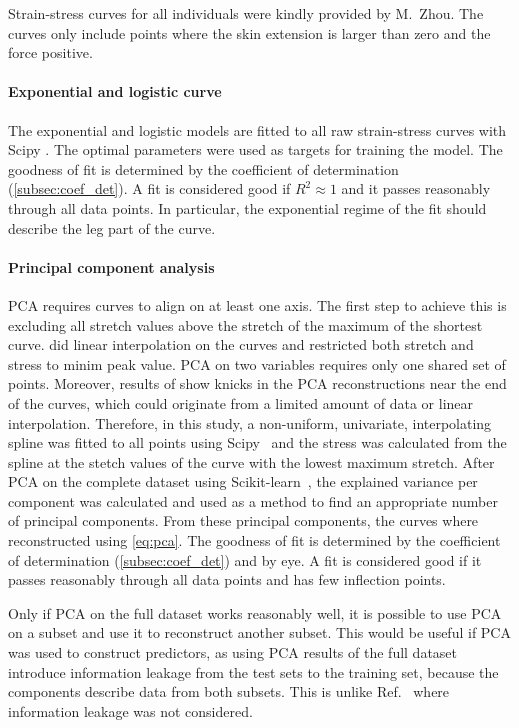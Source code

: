 Strain-stress curves for all individuals were kindly provided by M.\ Zhou.
The curves only include points where the skin extension is larger than zero and the force positive.

\paragraph{Exponential and logistic curve}
The exponential and logistic models are fitted to all raw strain-stress curves with Scipy .
The optimal parameters were used as targets for training the model.
The goodness of fit is determined by the coefficient of determination (\cref{subsec:coef_det}).
A fit is considered good if $R^2 \approx 1$ and it passes reasonably through all data points.
In particular, the exponential regime of the fit should describe the leg part of the curve.

\paragraph{Principal component analysis}
PCA requires curves to align on at least one axis.
The first step to achieve this is excluding all stretch values above the stretch of the maximum of the shortest curve.
\citeauthor{Soylu2022}  did linear interpolation on the curves and restricted both stretch and stress to minim peak value.
PCA on two variables requires only one shared set of points.
Moreover, results of \citeauthor{Soylu2022} show knicks in the PCA reconstructions near the end of the curves, which could originate from a limited amount of data or linear interpolation.
Therefore, in this study, a non-uniform, univariate, interpolating spline was fitted to all points using Scipy~ and the stress was calculated from the spline at the stetch values of the curve with the lowest maximum stretch.
After PCA on the complete dataset using Scikit-learn~, the explained variance per component was calculated and used as a method to find an appropriate number of principal components.
From these principal components, the curves where reconstructed using \cref{eq:pca}.
The goodness of fit is determined by the coefficient of determination (\cref{subsec:coef_det}) and by eye.
A fit is considered good if it passes reasonably through all data points and has few inflection points.

Only if PCA on the full dataset works reasonably well, it is possible to use PCA on a subset and use it to reconstruct another subset.
This would be useful if PCA was used to construct predictors, as using PCA results of the full dataset introduce information leakage from the test sets to the training set, because the components describe data from both subsets.
This is unlike Ref.~ where information leakage was not considered.

